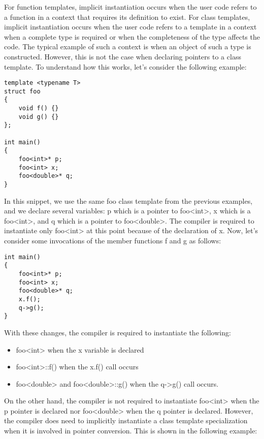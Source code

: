 For function templates, implicit instantiation occurs when the user code refers to a function in a context that requires its definition to exist. For class templates, implicit instantiation occurs when the user code refers to a template in a context when a complete type is required or when the completeness of the type affects the code. The typical example of such a context is when an object of such a type is constructed. However, this is not the case when declaring pointers to a class template. To understand how this works, let's consider the following example:

\begin{lstlisting}[style=styleCXX]
template <typename T>
struct foo
{
	void f() {}
	void g() {}
};

int main()
{
	foo<int>* p;
	foo<int> x;
	foo<double>* q;
}
\end{lstlisting}

In this snippet, we use the same foo class template from the previous examples, and we declare several variables: p which is a pointer to foo<int>, x which is a foo<int>, and q which is a pointer to foo<double>. The compiler is required to instantiate only foo<int> at this point because of the declaration of x. Now, let's consider some invocations of the member functions f and g as follows:

\begin{lstlisting}[style=styleCXX]
int main()
{
	foo<int>* p;
	foo<int> x;
	foo<double>* q;
	x.f();
	q->g();
}
\end{lstlisting}

With these changes, the compiler is required to instantiate the following:

\begin{itemize}
\item 
foo<int> when the x variable is declared

\item 
foo<int>::f() when the x.f() call occurs

\item 
foo<double> and foo<double>::g() when the q->g() call occurs.
\end{itemize}

On the other hand, the compiler is not required to instantiate foo<int> when the p pointer is declared nor foo<double> when the q pointer is declared. However, the compiler does need to implicitly instantiate a class template specialization when it is involved in pointer conversion. This is shown in the following example:

